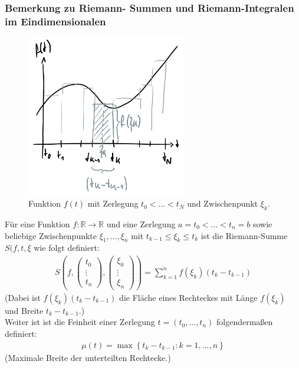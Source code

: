 \documentclass[11pt,a4paper]{book}
\newcommand {\R}	{\mathbb{R}}
\newcommand{\1}    	{\mathbbm{1}}
\begin{document}
\subsubsection*{Bemerkung zu Riemann- Summen und Riemann-Integralen im Eindimensionalen}
\begin{figure}[!h]
  	\centering
 	\includegraphics[width=7cm]{grafiken/Riemann-Summe.png}
  	\caption{Funktion \(f(t)\) mit Zerlegung \(t_0 < ... < t_N\) und Zwischenpunkt \(\xi_k\).}
\end{figure}

Für eine Funktion \(f: \R \rightarrow \R\) und eine Zerlegung \(a = t_0 < ... < t_n = b\) sowie beliebige Zwischenpunkte \(\xi_1, ..., \xi_n\) mit \(t_{k-1} \leqslant \xi_k \leqslant t_k\) ist die Riemann-Summe \(S(f,t,\xi\) wie folgt definiert:
\begin{align*}
	S\left(f, \left( \begin{array}{c}
		t_0 \\ \vdots \\ t_n	
	\end{array} \right), \left( \begin{array}{c}
		\xi_0 \\ \vdots \\ \xi_n	
	\end{array} \right) \right) = 
	\sum_{k=1}^n f(\xi_k)(t_k - t_{k-1})
\end{align*}
(Dabei ist \( f(\xi_k)(t_k - t_{k-1}) \) die Fläche eines Rechteckes mit Länge \(f(\xi_k)\) und Breite \( t_k - t_{k-1} \).)\\

\noindent
Weiter ist ist die Feinheit einer Zerlegung \(t=(t_0, ..., t_n)\) folgendermaßen definiert:
\begin{align*}
	\mu(t) = \max\left\{ t_k - t_{k-1}: k = 1, ..., n \right\}
\end{align*}
(Maximale Breite der unterteilten Rechtecke.)\\
\end{document}
